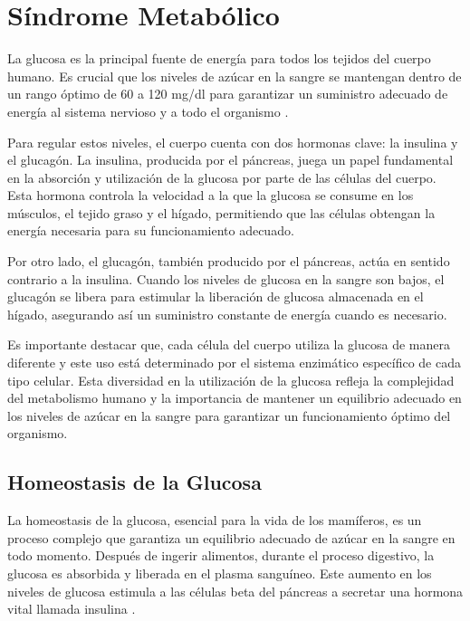 \chapter{Síndrome Metabólico}\label{insulina}

La glucosa es la principal fuente de energía para todos los tejidos del cuerpo humano. Es crucial que los niveles de azúcar en la sangre se mantengan dentro de un rango óptimo de 60 a 120 mg/dl para garantizar un suministro adecuado de energía al sistema nervioso y a todo el organismo \cite{ImgHomeos}.

Para regular estos niveles, el cuerpo cuenta con dos hormonas clave: la insulina y el glucagón. La insulina, producida por el páncreas, juega un papel fundamental en la absorción y utilización de la glucosa por parte de las células del cuerpo. Esta hormona controla la velocidad a la que la glucosa se consume en los músculos, el tejido graso y el hígado, permitiendo que las células obtengan la energía necesaria para su funcionamiento adecuado.

Por otro lado, el glucagón, también producido por el páncreas, actúa en sentido contrario a la insulina. Cuando los niveles de glucosa en la sangre son bajos, el glucagón se libera para estimular la liberación de glucosa almacenada en el hígado, asegurando así un suministro constante de energía cuando es necesario.

Es importante destacar que, cada célula del cuerpo utiliza la glucosa de manera diferente y este uso está determinado por el sistema enzimático específico de cada tipo celular. Esta diversidad en la utilización de la glucosa refleja la complejidad del metabolismo humano y la importancia de mantener un equilibrio adecuado en los niveles de azúcar en la sangre para garantizar un funcionamiento óptimo del organismo.\cite{capitulo4Metabolic}

\section{Homeostasis de la Glucosa}

La homeostasis de la glucosa, esencial para la vida de los mamíferos, es un proceso complejo que garantiza un equilibrio adecuado de azúcar en la sangre en todo momento. Después de ingerir alimentos, durante el proceso digestivo, la glucosa es absorbida y liberada en el plasma sanguíneo. Este aumento en los niveles de glucosa estimula a las células beta del páncreas a secretar una hormona vital llamada insulina \cite{capitulo4Metabolic}.

